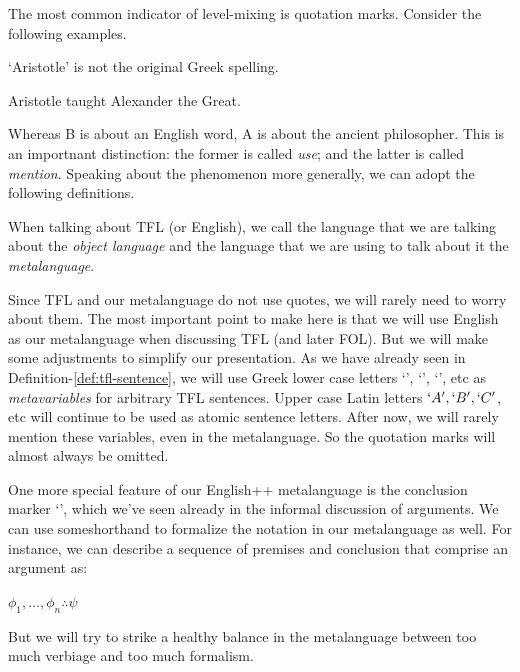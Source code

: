 The most common indicator of level-mixing is quotation marks. Consider the following
examples.

\begin{argument}
\item[A:] `Aristotle' is not the original Greek spelling.  
\item[B:] Aristotle taught Alexander the Great.
\end{argument}

Whereas B is about an English word, A is about the ancient philosopher. This is an
importnant distinction: the former is called \emph{use}; and the latter is called
\emph{mention}. Speaking about the phenomenon more generally, we can adopt the following
definitions.

\begin{definition}
  When talking about TFL (or English), we call the language that we are talking
  about the \emph{object language} and the language that we are using to talk
  about it the \emph{metalanguage}.
\end{definition}

Since TFL and our metalanguage do not use quotes, we will rarely need to worry about
them. The most important point to make here is that we will use English as our
metalanguage when discussing TFL (and later FOL). But we will make some adjustments to
simplify our presentation. As we have already seen in Definition-\ref{def:tfl-sentence},
we will use Greek lower case letters `\ephi', `\epsi', `\echi', etc as
\emph{metavariables} for arbitrary TFL sentences. Upper case Latin letters $`A', `B',
`C'$, etc will continue to be used as atomic sentence letters. After now, we will rarely
mention these variables, even in the metalanguage. So the quotation marks will almost
always be omitted.

One more special feature of our English++ metalanguage is the conclusion marker
`\therefore', which we've seen already in the informal discussion of arguments. We can
use someshorthand to formalize the notation in our metalanguage as well. For instance,
we can describe a sequence of premises and conclusion that comprise an argument as:

\begin{argument}
\item[] $\phi_1,\dots,\phi_n  \therefore  \psi$
\end{argument}

But we will try to strike a healthy balance in the metalanguage between too much verbiage
and too much formalism.

